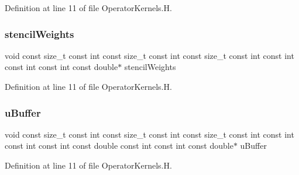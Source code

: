 Definition at line 11 of file Operator\+Kernels.\+H.

\hypertarget{OperatorKernels_8H_a71782584f6f521c3d69ed8a53fbbbd59}{}\label{OperatorKernels_8H_a71782584f6f521c3d69ed8a53fbbbd59} 
\subsubsection{\texorpdfstring{stencil\+Weights}{stencilWeights}}
{\footnotesize\ttfamily void const size\+\_\+t const int const size\+\_\+t const int const size\+\_\+t const int const int const int const int const double$\ast$ stencil\+Weights}



Definition at line 11 of file Operator\+Kernels.\+H.

\hypertarget{OperatorKernels_8H_a4761677c378739f45400fb946cfcb8a8}{}\label{OperatorKernels_8H_a4761677c378739f45400fb946cfcb8a8} 
\subsubsection{\texorpdfstring{u\+Buffer}{uBuffer}}
{\footnotesize\ttfamily void const size\+\_\+t const int const size\+\_\+t const int const size\+\_\+t const int const int const int const int const double const int const int const double$\ast$ u\+Buffer}



Definition at line 11 of file Operator\+Kernels.\+H.

